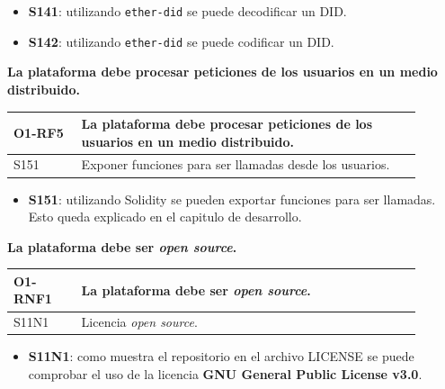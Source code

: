 \begin{itemize}
    \item \textbf{S141}: utilizando \verb|ether-did| se puede decodificar un DID.
    \item \textbf{S142}: utilizando \verb|ether-did| se puede codificar un DID.
\end{itemize}
\textbf{La plataforma debe procesar peticiones de los usuarios en un medio distribuido.}
\begin{center}
    \begin{table}[H]
        \begin{tabular}{|p{0.15\linewidth} | p{0.75\linewidth}|}
            \hline
            
            \textbf{O1-RF5} & \textbf{La plataforma debe procesar peticiones de los usuarios en un medio distribuido.} \\
            \hline
            S151            & Exponer funciones para ser llamadas desde los usuarios. \\
            \hline
        \end{tabular}
    \end{table}
\end{center}
\begin{itemize}
    \item \textbf{S151}: utilizando Solidity se pueden exportar funciones para ser llamadas. Esto queda explicado en el capitulo de desarrollo.
\end{itemize}
\textbf{La plataforma debe ser \textit{open source}.}
\begin{center}
    \begin{table}[h!]
        \begin{tabular}{|p{0.15\linewidth} | p{0.75\linewidth}|}
            \hline
             
            \textbf{O1-RNF1} & \textbf{La plataforma debe ser \textit{open source}.} \\
            \hline
            S11N1            & Licencia \textit{open source}. \\
            \hline
        \end{tabular}
    \end{table}
\end{center}
\begin{itemize}
    \item \textbf{S11N1}: como muestra el repositorio en el archivo LICENSE \cite{web:LICENSE} se puede comprobar el uso de la licencia \textbf{GNU General Public License v3.0}.
\end{itemize}
